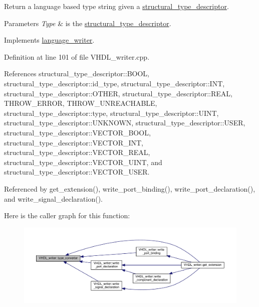 Return a language based type string given a \hyperlink{structstructural__type__descriptor}{structural\+\_\+type\+\_\+descriptor}. 


\begin{DoxyParams}{Parameters}
{\em Type} & is the \hyperlink{structstructural__type__descriptor}{structural\+\_\+type\+\_\+descriptor}. \\
\hline
\end{DoxyParams}


Implements \hyperlink{classlanguage__writer_a1ac884fda2f8990edf61f914af7b04dd}{language\+\_\+writer}.



Definition at line 101 of file V\+H\+D\+L\+\_\+writer.\+cpp.



References structural\+\_\+type\+\_\+descriptor\+::\+B\+O\+OL, structural\+\_\+type\+\_\+descriptor\+::id\+\_\+type, structural\+\_\+type\+\_\+descriptor\+::\+I\+NT, structural\+\_\+type\+\_\+descriptor\+::\+O\+T\+H\+ER, structural\+\_\+type\+\_\+descriptor\+::\+R\+E\+AL, T\+H\+R\+O\+W\+\_\+\+E\+R\+R\+OR, T\+H\+R\+O\+W\+\_\+\+U\+N\+R\+E\+A\+C\+H\+A\+B\+LE, structural\+\_\+type\+\_\+descriptor\+::type, structural\+\_\+type\+\_\+descriptor\+::\+U\+I\+NT, structural\+\_\+type\+\_\+descriptor\+::\+U\+N\+K\+N\+O\+WN, structural\+\_\+type\+\_\+descriptor\+::\+U\+S\+ER, structural\+\_\+type\+\_\+descriptor\+::\+V\+E\+C\+T\+O\+R\+\_\+\+B\+O\+OL, structural\+\_\+type\+\_\+descriptor\+::\+V\+E\+C\+T\+O\+R\+\_\+\+I\+NT, structural\+\_\+type\+\_\+descriptor\+::\+V\+E\+C\+T\+O\+R\+\_\+\+R\+E\+AL, structural\+\_\+type\+\_\+descriptor\+::\+V\+E\+C\+T\+O\+R\+\_\+\+U\+I\+NT, and structural\+\_\+type\+\_\+descriptor\+::\+V\+E\+C\+T\+O\+R\+\_\+\+U\+S\+ER.



Referenced by get\+\_\+extension(), write\+\_\+port\+\_\+binding(), write\+\_\+port\+\_\+declaration(), and write\+\_\+signal\+\_\+declaration().

Here is the caller graph for this function\+:
\nopagebreak
\begin{figure}[H]
\begin{center}
\leavevmode
\includegraphics[width=350pt]{d0/d0c/structVHDL__writer_aaadfd937b71dd556923b7e20e18cab60_icgraph}
\end{center}
\end{figure}
\mbox{\label{structVHDL__writer_aebe9a464e894d42bd3493c104d537e7f}} 
